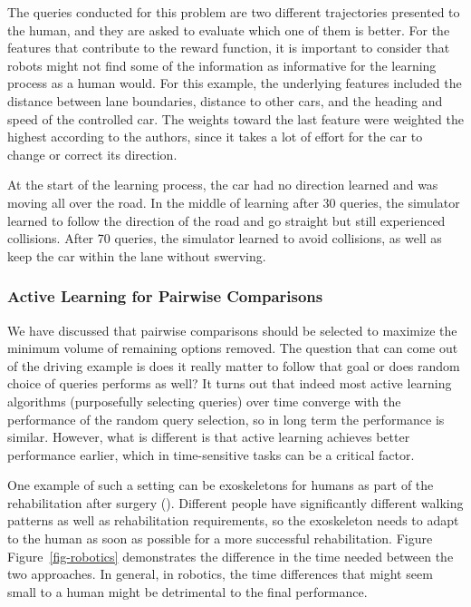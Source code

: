 \documentclass[
  letterpaper,
  numbers=noenddot,
  DIV=11]{scrreprt}
\theoremstyle{plain}
\theoremstyle{definition}
\theoremstyle{plain}
\theoremstyle{remark}
\begin{document}
The queries conducted for this problem are two different trajectories
presented to the human, and they are asked to evaluate which one of them
is better. For the features that contribute to the reward function, it
is important to consider that robots might not find some of the
information as informative for the learning process as a human would.
For this example, the underlying features included the distance between
lane boundaries, distance to other cars, and the heading and speed of
the controlled car. The weights toward the last feature were weighted
the highest according to the authors, since it takes a lot of effort for
the car to change or correct its direction.

At the start of the learning process, the car had no direction learned
and was moving all over the road. In the middle of learning after 30
queries, the simulator learned to follow the direction of the road and
go straight but still experienced collisions. After 70 queries, the
simulator learned to avoid collisions, as well as keep the car within
the lane without swerving.

\subsubsection*{Active Learning for Pairwise
Comparisons}\label{active-learning-for-pairwise-comparisons}

We have discussed that pairwise comparisons should be selected to
maximize the minimum volume of remaining options removed. The question
that can come out of the driving example is does it really matter to
follow that goal or does random choice of queries performs as well? It
turns out that indeed most active learning algorithms (purposefully
selecting queries) over time converge with the performance of the random
query selection, so in long term the performance is similar. However,
what is different is that active learning achieves better performance
earlier, which in time-sensitive tasks can be a critical factor.

One example of such a setting can be exoskeletons for humans as part of
the rehabilitation after surgery (). Different people have significantly different walking patterns
as well as rehabilitation requirements, so the exoskeleton needs to
adapt to the human as soon as possible for a more successful
rehabilitation. Figure Figure~\ref{fig-robotics} demonstrates the
difference in the time needed between the two approaches. In general, in
robotics, the time differences that might seem small to a human might be
detrimental to the final performance.
\end{document}
